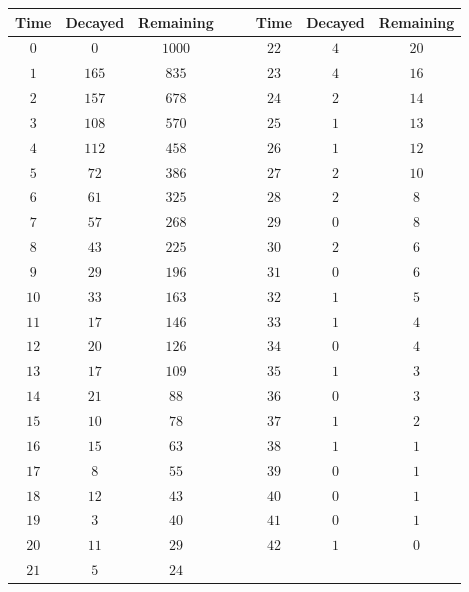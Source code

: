\begin{tabular}{cccrrccc} \toprule
Time & Decayed & Remaining &&& Time & Decayed & Remaining \\\midrule
$0$  & $0$     & $1000$    &&& $22$ & $4$     & $20$      \\[4pt]
$1$  & $165$   & $835$     &&& $23$ & $4$     & $16$      \\[4pt]
$2$  & $157$   & $678$     &&& $24$ & $2$     & $14$      \\[4pt]
$3$  & $108$   & $570$     &&& $25$ & $1$     & $13$      \\[4pt]
$4$  & $112$   & $458$     &&& $26$ & $1$     & $12$      \\[4pt]
$5$  & $72$    & $386$     &&& $27$ & $2$     & $10$      \\[4pt]
$6$  & $61$    & $325$     &&& $28$ & $2$     & $8$       \\[4pt]
$7$  & $57$    & $268$     &&& $29$ & $0$     & $8$       \\[4pt]
$8$  & $43$    & $225$     &&& $30$ & $2$     & $6$       \\[4pt]
$9$  & $29$    & $196$     &&& $31$ & $0$     & $6$       \\[4pt]
$10$ & $33$    & $163$     &&& $32$ & $1$     & $5$       \\[4pt]
$11$ & $17$    & $146$     &&& $33$ & $1$     & $4$       \\[4pt]
$12$ & $20$    & $126$     &&& $34$ & $0$     & $4$       \\[4pt]
$13$ & $17$    & $109$     &&& $35$ & $1$     & $3$       \\[4pt]
$14$ & $21$    & $88$      &&& $36$ & $0$     & $3$       \\[4pt]
$15$ & $10$    & $78$      &&& $37$ & $1$     & $2$       \\[4pt]
$16$ & $15$    & $63$      &&& $38$ & $1$     & $1$       \\[4pt]
$17$ & $8$     & $55$      &&& $39$ & $0$     & $1$       \\[4pt]
$18$ & $12$    & $43$      &&& $40$ & $0$     & $1$       \\[4pt]
$19$ & $3$     & $40$      &&& $41$ & $0$     & $1$       \\[4pt]
$20$ & $11$    & $29$      &&& $42$ & $1$     & $0$       \\[4pt]
$21$ & $5$     & $24$ \\\bottomrule
\end{tabular}
